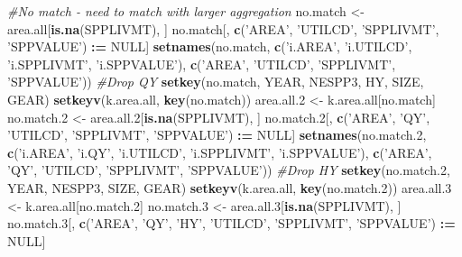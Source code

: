 \documentclass[]{article}
\newenvironment{Shaded}{\begin{snugshade}}{\end{snugshade}}
\newcommand{\KeywordTok}[1]{\textcolor[rgb]{0.13,0.29,0.53}{\textbf{#1}}}
\newcommand{\DecValTok}[1]{\textcolor[rgb]{0.00,0.00,0.81}{#1}}
\newcommand{\StringTok}[1]{\textcolor[rgb]{0.31,0.60,0.02}{#1}}
\newcommand{\CommentTok}[1]{\textcolor[rgb]{0.56,0.35,0.01}{\textit{#1}}}
\newcommand{\OtherTok}[1]{\textcolor[rgb]{0.56,0.35,0.01}{#1}}
\newcommand{\OperatorTok}[1]{\textcolor[rgb]{0.81,0.36,0.00}{\textbf{#1}}}
\newcommand{\ErrorTok}[1]{\textcolor[rgb]{0.64,0.00,0.00}{\textbf{#1}}}
\newcommand{\NormalTok}[1]{#1}
\begin{document}
\begin{Shaded}
\begin{Highlighting}[]
  \CommentTok{#No match - need to match with larger aggregation}
\NormalTok{  no.match  <-}\StringTok{ }\NormalTok{area.all[}\KeywordTok{is.na}\NormalTok{(SPPLIVMT), ]}
\NormalTok{  no.match[, }\KeywordTok{c}\NormalTok{(}\StringTok{'AREA'}\NormalTok{, }\StringTok{'UTILCD'}\NormalTok{, }\StringTok{'SPPLIVMT'}\NormalTok{, }\StringTok{'SPPVALUE'}\NormalTok{) }\OperatorTok{:}\ErrorTok{=}\StringTok{ }\OtherTok{NULL}\NormalTok{]}
  \KeywordTok{setnames}\NormalTok{(no.match, }\KeywordTok{c}\NormalTok{(}\StringTok{'i.AREA'}\NormalTok{, }\StringTok{'i.UTILCD'}\NormalTok{, }\StringTok{'i.SPPLIVMT'}\NormalTok{, }\StringTok{'i.SPPVALUE'}\NormalTok{), }
           \KeywordTok{c}\NormalTok{(}\StringTok{'AREA'}\NormalTok{, }\StringTok{'UTILCD'}\NormalTok{, }\StringTok{'SPPLIVMT'}\NormalTok{, }\StringTok{'SPPVALUE'}\NormalTok{))}
  \CommentTok{#Drop QY}
  \KeywordTok{setkey}\NormalTok{(no.match, YEAR, NESPP3, HY, SIZE, GEAR)}
  \KeywordTok{setkeyv}\NormalTok{(k.area.all, }\KeywordTok{key}\NormalTok{(no.match))}
\NormalTok{  area.all.}\DecValTok{2}\NormalTok{ <-}\StringTok{ }\NormalTok{k.area.all[no.match]}
\NormalTok{  no.match.}\DecValTok{2}\NormalTok{ <-}\StringTok{ }\NormalTok{area.all.}\DecValTok{2}\NormalTok{[}\KeywordTok{is.na}\NormalTok{(SPPLIVMT), ]}
\NormalTok{  no.match.}\DecValTok{2}\NormalTok{[, }\KeywordTok{c}\NormalTok{(}\StringTok{'AREA'}\NormalTok{, }\StringTok{'QY'}\NormalTok{, }\StringTok{'UTILCD'}\NormalTok{, }\StringTok{'SPPLIVMT'}\NormalTok{, }\StringTok{'SPPVALUE'}\NormalTok{) }\OperatorTok{:}\ErrorTok{=}\StringTok{ }\OtherTok{NULL}\NormalTok{]}
  \KeywordTok{setnames}\NormalTok{(no.match.}\DecValTok{2}\NormalTok{, }\KeywordTok{c}\NormalTok{(}\StringTok{'i.AREA'}\NormalTok{, }\StringTok{'i.QY'}\NormalTok{, }\StringTok{'i.UTILCD'}\NormalTok{, }\StringTok{'i.SPPLIVMT'}\NormalTok{, }\StringTok{'i.SPPVALUE'}\NormalTok{), }
           \KeywordTok{c}\NormalTok{(}\StringTok{'AREA'}\NormalTok{, }\StringTok{'QY'}\NormalTok{, }\StringTok{'UTILCD'}\NormalTok{, }\StringTok{'SPPLIVMT'}\NormalTok{, }\StringTok{'SPPVALUE'}\NormalTok{))}
  \CommentTok{#Drop HY}
  \KeywordTok{setkey}\NormalTok{(no.match.}\DecValTok{2}\NormalTok{, YEAR, NESPP3, SIZE, GEAR)}
  \KeywordTok{setkeyv}\NormalTok{(k.area.all, }\KeywordTok{key}\NormalTok{(no.match.}\DecValTok{2}\NormalTok{))}
\NormalTok{  area.all.}\DecValTok{3}\NormalTok{ <-}\StringTok{ }\NormalTok{k.area.all[no.match.}\DecValTok{2}\NormalTok{]}
\NormalTok{  no.match.}\DecValTok{3}\NormalTok{ <-}\StringTok{ }\NormalTok{area.all.}\DecValTok{3}\NormalTok{[}\KeywordTok{is.na}\NormalTok{(SPPLIVMT), ]}
\NormalTok{  no.match.}\DecValTok{3}\NormalTok{[, }\KeywordTok{c}\NormalTok{(}\StringTok{'AREA'}\NormalTok{, }\StringTok{'QY'}\NormalTok{, }\StringTok{'HY'}\NormalTok{, }\StringTok{'UTILCD'}\NormalTok{, }\StringTok{'SPPLIVMT'}\NormalTok{, }\StringTok{'SPPVALUE'}\NormalTok{) }\OperatorTok{:}\ErrorTok{=}\StringTok{ }\OtherTok{NULL}\NormalTok{]}

\end{Highlighting}
\end{Shaded}
\end{document}
